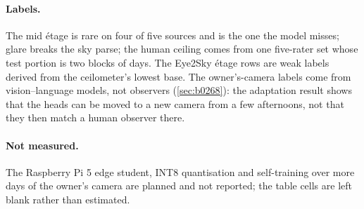 \paragraph{Labels.} The mid \'etage is rare on four of five sources and is the one the model misses; glare breaks
the sky parse; the human ceiling comes from one five-rater set whose test portion is two blocks of days. The
Eye2Sky \'etage rows are weak labels derived from the ceilometer's lowest base. The owner's-camera labels come
from vision--language models, not observers (\cref{sec:b0268}): the adaptation result shows that the heads can be
moved to a new camera from a few afternoons, not that they then match a human observer there.

\paragraph{Not measured.} The Raspberry Pi 5 edge student, INT8 quantisation and self-training over more days of
the owner's camera are planned and not reported; the table cells are left blank rather than estimated.
